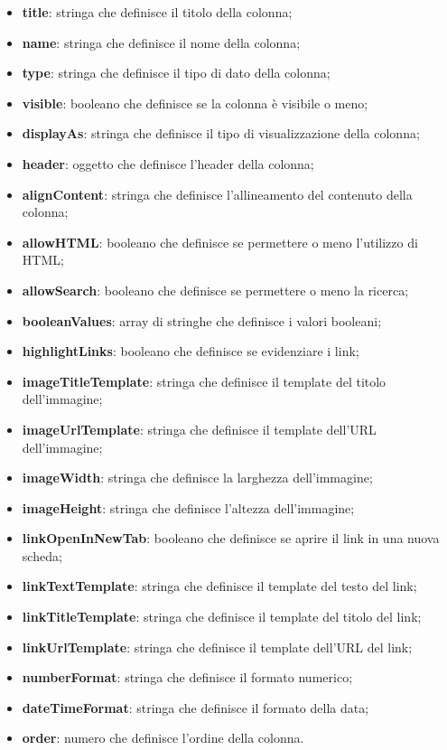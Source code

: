\begin{itemize}
      \item \textbf{title}: stringa che definisce il titolo della colonna;
      \item \textbf{name}: stringa che definisce il nome della colonna;
      \item \textbf{type}: stringa che definisce il tipo di dato della colonna;
      \item \textbf{visible}: booleano che definisce se la colonna è visibile o meno;
      \item \textbf{displayAs}: stringa che definisce il tipo di visualizzazione della colonna;
      \item \textbf{header}: oggetto che definisce l'header della colonna;
      \item \textbf{alignContent}: stringa che definisce l'allineamento del contenuto della colonna;
      \item \textbf{allowHTML}: booleano che definisce se permettere o meno l'utilizzo di HTML;
      \item \textbf{allowSearch}: booleano che definisce se permettere o meno la ricerca;
      \item \textbf{booleanValues}: array di stringhe che definisce i valori booleani;
      \item \textbf{highlightLinks}: booleano che definisce se evidenziare i link;
      \item \textbf{imageTitleTemplate}: stringa che definisce il template del titolo dell'immagine;
      \item \textbf{imageUrlTemplate}: stringa che definisce il template dell'URL dell'immagine;
      \item \textbf{imageWidth}: stringa che definisce la larghezza dell'immagine;
      \item \textbf{imageHeight}: stringa che definisce l'altezza dell'immagine;
      \item \textbf{linkOpenInNewTab}: booleano che definisce se aprire il link in una nuova scheda;
      \item \textbf{linkTextTemplate}: stringa che definisce il template del testo del link;
      \item \textbf{linkTitleTemplate}: stringa che definisce il template del titolo del link;
      \item \textbf{linkUrlTemplate}: stringa che definisce il template dell'URL del link;
      \item \textbf{numberFormat}: stringa che definisce il formato numerico;
      \item \textbf{dateTimeFormat}: stringa che definisce il formato della data;
      \item \textbf{order}: numero che definisce l'ordine della colonna.
\end{itemize}


